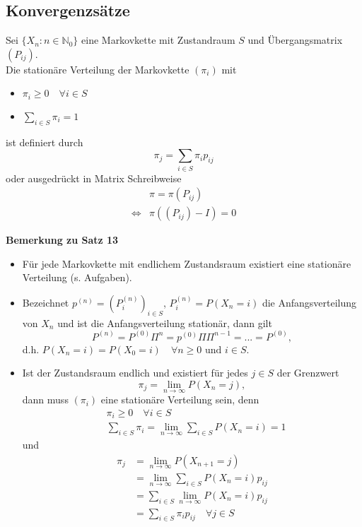 \documentclass[a4paper,12pt]{article}
\begin{document}
\subsection{Konvergenzsätze}

\begin{tcolorbox}[breakable, colframe=green, colback=white, title=Satz 13]
	Sei $\{X_n: n \in \mathbb{N}_0\}$ eine Markovkette mit Zustandraum $S$ und Übergangsmatrix $(P_{ij})$.\\
	Die stationäre Verteilung der Markovkette  $(\pi_i)$ mit
	\begin{itemize}
		\item $\pi_i \geq 0 \quad \forall i \in S$
		\item $\sum_{i \in S}\pi_i = 1$
	\end{itemize}
	ist definiert durch
	$$
		\pi_j = \sum_{i \in S}\pi_i p_{ij}
	$$
	oder ausgedrückt in Matrix Schreibweise
	\begin{align*}
		                & \pi = \pi(P_{ij})     \\
		\Leftrightarrow & \pi((P_{ij}) - I) = 0
	\end{align*}
\end{tcolorbox}

\textbf{Bemerkung zu Satz 13}\\
\begin{itemize}
	\item Für jede Markovkette mit endlichem Zustandsraum existiert eine stationäre Verteilung (s. Aufgaben).
	\item Bezeichnet $p^{(n)} = (P_i^{(n)})_{i \in S}$, $P_i^{(n)} = P(X_n = i)$ die Anfangsverteilung
	      von $X_n$ und ist die Anfangsverteilung stationär, dann gilt
	      $$
		      P^{(n)} = P^{(0)}\Pi^n = p^{(0)}\Pi\Pi^{n-1} = ... = P^{(0)},
	      $$
	      d.h. $P(X_n = i) = P(X_0 = i) \quad \forall n \geq 0 \text{ und } i \in S$.
	\item Ist der Zustandsraum endlich und existiert für jedes $j \in S$ der Grenzwert
	      $$
		      \pi_j = \lim_{n \to \infty}P(X_n = j),
	      $$
	      dann muss $(\pi_i)$ eine stationäre Verteilung sein, denn
	      \begin{align*}
		       & \pi_i \geq 0 \quad \forall i \in S                                     \\
		       & \sum_{i \in S} \pi_i = \lim_{n \to \infty}\sum_{i \in S}P(X_n = i) = 1
	      \end{align*}
	      und
	      \begin{align*}
		      \pi_j & = \lim_{n \to \infty}P(X_{n+1} = j)                  \\
		            & = \lim_{n \to \infty} \sum_{i \in S}P(X_n = i)p_{ij} \\
		            & = \sum_{i \in S}\lim_{n \to \infty}P(X_n = i)p_{ij}  \\
		            & = \sum_{i \in S}\pi_i p_{ij} \quad \forall j \in S
	      \end{align*}
\end{itemize}
\end{document}
